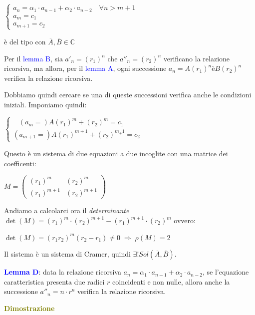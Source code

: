 \begin{flushleft}
\begin{boxA}
        {\centering
            $\begin{cases}
                a_n = \alpha_1 \cdot a_{n-1} + \alpha_2 \cdot a_{n-2} \quad \forall n > m + 1 \\
                a_m = c_1 \\
                a_{m+1} = c_2
            \end{cases}$
        \par}
        è del tipo  con $\overline{A}, \overline{B} \in \mathbb{C}$

        Per il \textcolor{blue}{lemma B}, sia $a'_n = (r_1)^n$ che $a''_n = (r_2)^n$ verificano la relazione ricorsiva, ma allora, per il \textcolor{blue}{lemma A}, ogni successione $a_n = A(r_1)^n è B(r_2)^n$ verifica la relazione ricorsiva.

        Dobbiamo quindi cercare se una di queste successioni verifica anche le condizioni iniziali. Imponiamo quindi:
        
        {\centering
            $\begin{cases}    
                \;\;\; (a_m =)A(r_1)^m + (r_2)^m = c_1 \\
                (a_{m+1} =)A(r_1)^{m+1} + (r_2)^{m_+1} = c_2
            \end{cases}$
        \par}
        Questo è un sistema di due equazioni a due incoglite con una matrice dei coefficenti:

        {\centering
        $M = \left(\begin{array}{cc} (r_1)^m & (r_2)^m \\
            (r_1)^{m+1} & (r_2)^{m+1} \end{array}\right)$
        \par}
        Andiamo a calcolarci ora il \textit{determinante} $\det(M) = (r_1)^m \cdot (r_2)^{m+1} - (r_1)^{m+1} \cdot (r_2)^m$ ovvero:

        {\centering
            $\det(M) = (r_1r_2)^m(r_2-r_1) \neq 0 \; \Rightarrow \; \rho(M) = 2$
        \par}
        Il sistema è un sistema di Cramer, quindi $\exists ! Sol(\overline{A}, \overline{B})$.
    \end{boxA}

    \newpage
    \textcolor{blue}{\textbf{Lemma D}}: data la relazione ricorsiva $a_n = \alpha_1 \cdot a_{n-1} + \alpha_2 \cdot a_{n-2}$, se l'equazione caratteristica presenta due radici $r$ coincidenti e non nulle, allora anche la successione $a''_n = n \cdot r^n$ verifica la relazione ricorsiva.
    \begin{boxA}
        \textcolor{olive}{\textbf{Dimostrazione}}


\end{boxA}
\end{flushleft}
